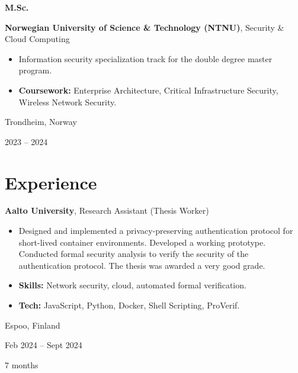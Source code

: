 \documentclass[10pt, a4paper]{article}
\newenvironment{highlights}{
    \begin{itemize}[
        topsep=0.10 cm,
        parsep=0.10 cm,
        partopsep=0pt,
        itemsep=0pt,
        leftmargin=0 cm + 10pt
    ]
}{
    \end{itemize}
} %
\newenvironment{twocolentry}[2][]{
    \onecolentry
    \def\secondColumn{#2}
    \setcolumnwidth{\fill, 3.1 cm}
    \begin{paracol}{2}
}{
    \switchcolumn \raggedleft \secondColumn
    \end{paracol}
    \endonecolentry
} %
\newenvironment{threecolentry}[3][]{
    \onecolentry
    \def\thirdColumn{#3}
    \setcolumnwidth{1 cm, \fill, 3.1 cm}
    \begin{paracol}{3}
    {\raggedright #2} \switchcolumn
}{
    \switchcolumn \raggedleft \thirdColumn
    \end{paracol}
    \endonecolentry
} %
\begin{document}
        \vspace{0.2 cm}

        \begin{threecolentry}{\textbf{M.Sc.}}{
            Trondheim, Norway

        2023 – 2024
        }
            \textbf{Norwegian University of Science \& Technology (NTNU)}, Security \& Cloud Computing
            \begin{highlights}
                \item Information security specialization track for the double degree master program.
                \item \textbf{Coursework:} Enterprise Architecture, Critical Infrastructure Security, Wireless Network Security.
            \end{highlights}
        \end{threecolentry}


    
    \section{Experience}



        
        \begin{twocolentry}{
            Espoo, Finland

        Feb 2024 – Sept 2024

        7 months
        }
            \textbf{Aalto University}, Research Assistant (Thesis Worker)
            \begin{highlights}
                \item Designed and implemented a privacy-preserving authentication protocol for short-lived container environments. Developed a working prototype. Conducted formal security analysis to verify the security of the authentication protocol. The thesis was awarded a very good grade.
                \item \textbf{Skills:} Network security, cloud, automated formal verification.
                \item \textbf{Tech:} JavaScript, Python, Docker, Shell Scripting, ProVerif.
            \end{highlights}
        \end{twocolentry}


        \vspace{0.2 cm}
\end{document}
